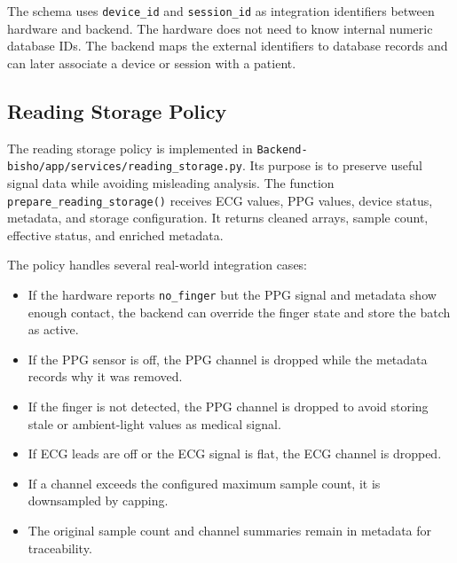 The schema uses \texttt{device\_id} and \texttt{session\_id} as integration identifiers between hardware and backend. The hardware does not need to know internal numeric database IDs. The backend maps the external identifiers to database records and can later associate a device or session with a patient.

\subsection{Reading Storage Policy}

The reading storage policy is implemented in \texttt{Backend-bisho/app/services/reading\_storage.py}. Its purpose is to preserve useful signal data while avoiding misleading analysis. The function \texttt{prepare\_reading\_storage()} receives ECG values, PPG values, device status, metadata, and storage configuration. It returns cleaned arrays, sample count, effective status, and enriched metadata.

The policy handles several real-world integration cases:

\begin{itemize}
    \item If the hardware reports \texttt{no\_finger} but the PPG signal and metadata show enough contact, the backend can override the finger state and store the batch as active.
    \item If the PPG sensor is off, the PPG channel is dropped while the metadata records why it was removed.
    \item If the finger is not detected, the PPG channel is dropped to avoid storing stale or ambient-light values as medical signal.
    \item If ECG leads are off or the ECG signal is flat, the ECG channel is dropped.
    \item If a channel exceeds the configured maximum sample count, it is downsampled by capping.
    \item The original sample count and channel summaries remain in metadata for traceability.
\end{itemize}

